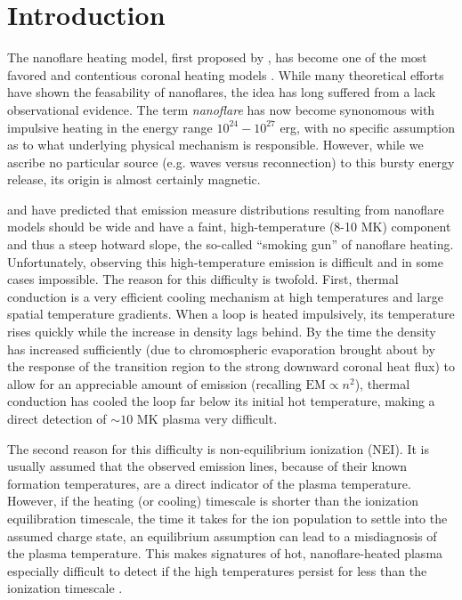 \documentclass[apj]{emulateapj}
\begin{document}
	\section{Introduction}
	\label{sec:intro}
	\par The nanoflare heating model, first proposed by \citet{parker_nanoflares_1988}, has become one of the most favored and contentious coronal heating models \citep{cargill_implications_1994,cargill_nanoflare_2004,klimchuk_solving_2006}. While many theoretical efforts \citep[e.g.][]{bradshaw_diagnosing_2012,reep_diagnosing_2013,cargill_active_2014} have shown the feasability of nanoflares, the idea has long suffered from a lack observational evidence. The term \textit{nanoflare} has now become synonomous with impulsive heating in the energy range $10^{24}-10^{27}$ erg, with no specific assumption as to what underlying physical mechanism is responsible. However, while we ascribe no particular source (e.g. waves versus reconnection) to this bursty energy release, its origin is almost certainly magnetic.
	\par \citet{cargill_implications_1994} and \citet{cargill_nanoflare_2004} have predicted that emission measure distributions resulting from nanoflare models should be wide and have a faint, high-temperature (8-10 MK) component and thus a steep hotward slope, the so-called ``smoking gun'' of nanoflare heating. Unfortunately, observing this high-temperature emission is difficult and in some cases impossible. The reason for this difficulty is twofold. First, thermal conduction is a very efficient cooling mechanism at high temperatures and large spatial temperature gradients. When a loop is heated impulsively, its temperature rises quickly while the increase in density lags behind. By the time the density has increased sufficiently (due to chromospheric evaporation brought about by the response of the transition region to the strong downward coronal heat flux) to allow for an appreciable amount of emission (recalling $\mathrm{EM}\propto n^2$), thermal conduction has cooled the loop far below its initial hot temperature, making a direct detection of $\sim10$ MK plasma very difficult. 
	\par The second reason for this difficulty is non-equilibrium ionization (NEI). It is usually assumed that the observed emission lines, because of their known formation temperatures, are a direct indicator of the plasma temperature. However, if the heating (or cooling) timescale is shorter than the ionization equilibration timescale, the time it takes for the ion population to settle into the assumed charge state, an equilibrium assumption can lead to a misdiagnosis of the plasma temperature. This makes signatures of hot, nanoflare-heated plasma especially difficult to detect if the high temperatures persist for less than the ionization timescale \citep{bradshaw_explosive_2006,bradshaw_what_2011,reale_nonequilibrium_2008}.
\end{document}
